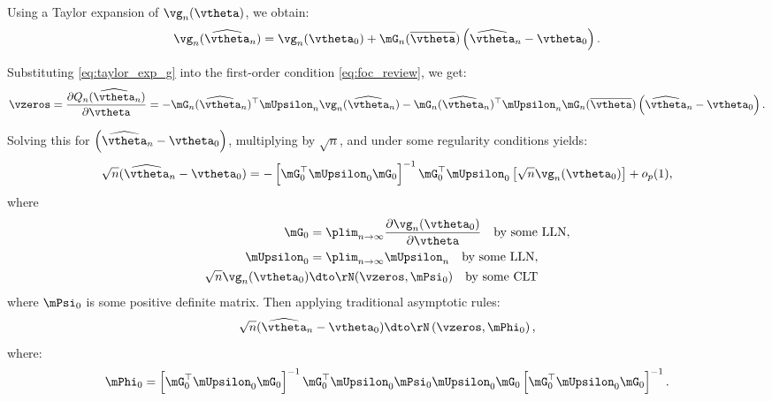 \documentclass[english,12pt]{book}\usepackage[]{graphicx}\usepackage[]{xcolor}
\begin{document}
Using a Taylor expansion of $\vg_n(\vtheta)$, we obtain:
\begin{equation}\label{eq:taylor_exp_g}
  \vg_n(\widehat{\vtheta}_n) = \vg_n(\vtheta_0) + \mG_n(\overline{\vtheta})\left(\widehat{\vtheta}_n - \vtheta_0\right).
\end{equation}

Substituting \eqref{eq:taylor_exp_g} into the first-order condition \eqref{eq:foc_review}, we get:
\begin{equation*}
  \vzeros = \frac{\partial Q_n(\widehat{\vtheta}_n)}{\partial \vtheta} = - \mG_n(\widehat{\vtheta}_n)^\top\mUpsilon_n\vg_n(\widehat{\vtheta}_n) - \mG_n(\widehat{\vtheta}_n)^\top\mUpsilon_n\mG_n(\overline{\vtheta})\left(\widehat{\vtheta}_n - \vtheta_0\right).
\end{equation*}

Solving this for $\left(\widehat{\vtheta}_n - \vtheta_0\right)$, multiplying by $\sqrt{n}$, and under some regularity conditions yields:
\begin{equation*}
\sqrt{n}(\widehat{\vtheta}_n - \vtheta_0) = - \left[\mG^\top_0\mUpsilon_0\mG_0\right]^{-1}\mG^\top_0\mUpsilon_0\left[\sqrt{n}\vg_n(\vtheta_0)\right] + o_p(1),
\end{equation*}
%
where
\begin{equation}\label{eq:asymptotic_distr_moment} 
\begin{aligned}
\mG_0 & = \plim_{n\to\infty}\frac{\partial \vg_n(\vtheta_0)}{\partial \vtheta} \quad \mbox{by some LLN},  \\
\mUpsilon_0 & = \plim_{n\to\infty}\mUpsilon_n\quad \mbox{by some LLN}, \\ 
\sqrt{n}\vg_n(\vtheta_0)& \dto  \rN(\vzeros, \mPsi_0) \quad \mbox{by some CLT} 
\end{aligned}
\end{equation}
%
where $\mPsi_0$ is some positive definite matrix. Then applying traditional asymptotic rules:
\begin{equation*}
\sqrt{n}(\widehat{\vtheta}_n - \vtheta_0)\dto \rN\left(\vzeros, \mPhi_0\right),
\end{equation*}
%
where:
\begin{equation*}
\mPhi_0 = \left[\mG^\top_0\mUpsilon_0\mG_0\right]^{-1}\mG^\top_0\mUpsilon_0\mPsi_0\mUpsilon_0\mG_0\left[\mG^\top_0\mUpsilon_0\mG_0\right]^{-1}. 
\end{equation*}
\end{document}
